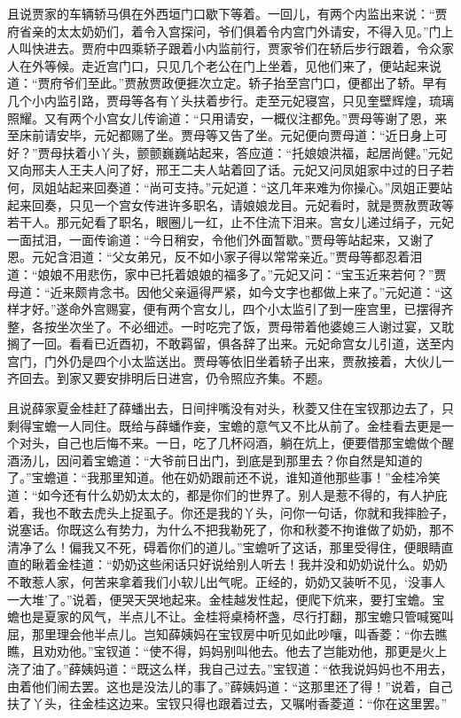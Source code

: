 \begin{parag}
    且说贾家的车辆轿马俱在外西垣门口歇下等着。一回儿，有两个内监出来说：“贾府省亲的太太奶奶们，着令入宫探问，爷们俱着令内宫门外请安，不得入见。”门上人叫快进去。贾府中四乘轿子跟着小内监前行，贾家爷们在轿后步行跟着，令众家人在外等候。走近宫门口，只见几个老公在门上坐着，见他们来了，便站起来说道：“贾府爷们至此。”贾赦贾政便捱次立定。轿子抬至宫门口，便都出了轿。早有几个小内监引路，贾母等各有丫头扶着步行。走至元妃寝宫，只见奎壁辉煌，琉璃照耀。又有两个小宫女儿传谕道：“只用请安，一概仪注都免。”贾母等谢了恩，来至床前请安毕，元妃都赐了坐。贾母等又告了坐。元妃便向贾母道：“近日身上可好？”贾母扶着小丫头，颤颤巍巍站起来，答应道：“托娘娘洪福，起居尚健。”元妃又向邢夫人王夫人问了好，邢王二夫人站着回了话。元妃又问凤姐家中过的日子若何，凤姐站起来回奏道：“尚可支持。”元妃道：“这几年来难为你操心。”凤姐正要站起来回奏，只见一个宫女传进许多职名，请娘娘龙目。元妃看时，就是贾赦贾政等若干人。那元妃看了职名，眼圈儿一红，止不住流下泪来。宫女儿递过绢子，元妃一面拭泪，一面传谕道：“今日稍安，令他们外面暂歇。”贾母等站起来，又谢了恩。元妃含泪道：“父女弟兄，反不如小家子得以常常亲近。”贾母等都忍着泪道：“娘娘不用悲伤，家中已托着娘娘的福多了。”元妃又问：“宝玉近来若何？”贾母道：“近来颇肯念书。因他父亲逼得严紧，如今文字也都做上来了。”元妃道：“这样才好。”遂命外宫赐宴，便有两个宫女儿，四个小太监引了到一座宫里，已摆得齐整，各按坐次坐了。不必细述。一时吃完了饭，贾母带着他婆媳三人谢过宴，又耽搁了一回。看看已近酉初，不敢羁留，俱各辞了出来。元妃命宫女儿引道，送至内宫门，门外仍是四个小太监送出。贾母等依旧坐着轿子出来，贾赦接着，大伙儿一齐回去。到家又要安排明后日进宫，仍令照应齐集。不题。
\end{parag}


\begin{parag}
    且说薛家夏金桂赶了薛蟠出去，日间拌嘴没有对头，秋菱又住在宝钗那边去了，只剩得宝蟾一人同住。既给与薛蟠作妾，宝蟾的意气又不比从前了。金桂看去更是一个对头，自己也后悔不来。一日，吃了几杯闷酒，躺在炕上，便要借那宝蟾做个醒酒汤儿，因问着宝蟾道：“大爷前日出门，到底是到那里去？你自然是知道的了。”宝蟾道：“我那里知道。他在奶奶跟前还不说，谁知道他那些事！”金桂冷笑道：“如今还有什么奶奶太太的，都是你们的世界了。别人是惹不得的，有人护庇着，我也不敢去虎头上捉虱子。你还是我的丫头，问你一句话，你就和我摔脸子，说塞话。你既这么有势力，为什么不把我勒死了，你和秋菱不拘谁做了奶奶，那不清净了么！偏我又不死，碍着你们的道儿。”宝蟾听了这话，那里受得住，便眼睛直直的瞅着金桂道：“奶奶这些闲话只好说给别人听去！我并没和奶奶说什么。奶奶不敢惹人家，何苦来拿着我们小软儿出气呢。正经的，奶奶又装听不见，‘没事人一大堆’了。”说着，便哭天哭地起来。金桂越发性起，便爬下炕来，要打宝蟾。宝蟾也是夏家的风气，半点儿不让。金桂将桌椅杯盏，尽行打翻，那宝蟾只管喊冤叫屈，那里理会他半点儿。岂知薛姨妈在宝钗房中听见如此吵嚷，叫香菱：“你去瞧瞧，且劝劝他。”宝钗道：“使不得，妈妈别叫他去。他去了岂能劝他，那更是火上浇了油了。”薛姨妈道：“既这么样，我自己过去。”宝钗道：“依我说妈妈也不用去，由着他们闹去罢。这也是没法儿的事了。”薛姨妈道：“这那里还了得！”说着，自己扶了丫头，往金桂这边来。宝钗只得也跟着过去，又嘱咐香菱道：“你在这里罢。”
\end{parag}


